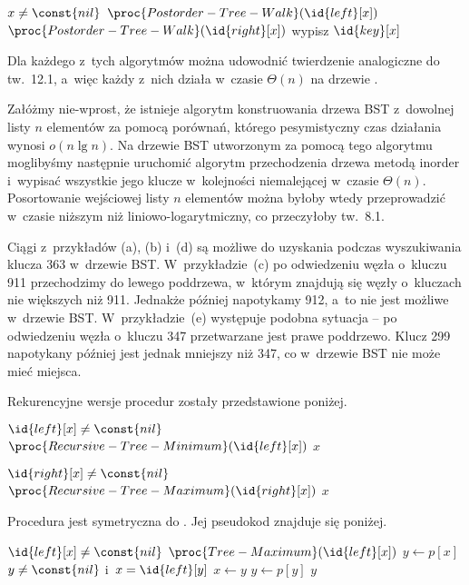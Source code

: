 \begin{codebox}
\li	\If $x\ne\const{nil}$
\li		\Then
			$\proc{Postorder-Tree-Walk}(\id{left}[x])$
\li			$\proc{Postorder-Tree-Walk}(\id{right}[x])$
\li			wypisz $\id{key}[x]$
		\End
\end{codebox}

Dla każdego z~tych algorytmów można udowodnić twierdzenie analogiczne do tw.~12.1, a~więc każdy z~nich działa w~czasie $\Theta(n)$ na drzewie .

\exercise %
Załóżmy nie-wprost, że istnieje algorytm konstruowania drzewa BST z~dowolnej listy $n$ elementów za pomocą porównań, którego pesymistyczny czas działania wynosi $o(n\lg n)$. Na drzewie BST utworzonym za pomocą tego algorytmu moglibyśmy następnie uruchomić algorytm przechodzenia drzewa metodą inorder i~wypisać wszystkie jego klucze w~kolejności niemalejącej w~czasie $\Theta(n)$. Posortowanie wejściowej listy $n$ elementów można byłoby wtedy przeprowadzić w~czasie niższym niż liniowo-logarytmiczny, co przeczyłoby tw.~8.1.


\exercise %
Ciągi z~przykładów (a), (b) i~(d) są możliwe do uzyskania podczas wyszukiwania klucza 363 w~drzewie BST. W~przykładzie~(c) po odwiedzeniu węzła o~kluczu 911 przechodzimy do lewego poddrzewa, w~którym znajdują się węzły o~kluczach nie większych niż 911. Jednakże później napotykamy 912, a~to nie jest możliwe w~drzewie BST. W~przykładzie~(e) występuje podobna sytuacja -- po odwiedzeniu węzła o~kluczu 347 przetwarzane jest prawe poddrzewo. Klucz 299 napotykany później jest jednak mniejszy niż 347, co w~drzewie BST nie może mieć miejsca.

\exercise %
Rekurencyjne wersje procedur zostały przedstawione poniżej.
\begin{codebox}
\li	\If $\id{left}[x]\ne\const{nil}$
\li		\Then \Return $\proc{Recursive-Tree-Minimum}(\id{left}[x])$
\li		\Else \Return $x$
		\End
\end{codebox}
\begin{codebox}
\li	\If $\id{right}[x]\ne\const{nil}$
\li		\Then \Return $\proc{Recursive-Tree-Maximum}(\id{right}[x])$
\li		\Else \Return $x$
		\End
\end{codebox}

\exercise %
Procedura  jest symetryczna do . Jej pseudokod znajduje się poniżej.
\begin{codebox}
\li	\If $\id{left}[x]\ne\const{nil}$
\li		\Then \Return $\proc{Tree-Maximum}(\id{left}[x])$
		\End
\li	$y\gets p[x]$
\li	\While $y\ne\const{nil}$ i~$x=\id{left}[y]$
\li		\Do
			$x\gets y$
\li			$y\gets p[y]$
		\End
\li	\Return $y$
\end{codebox}

